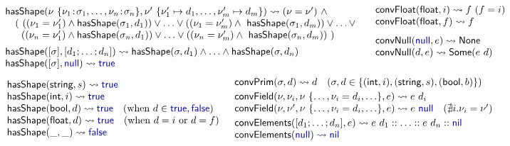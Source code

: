 \documentclass[pldi-cameraready]{sigplanconf-pldi16}
\newcommand{\kvd}[1]{\textnormal{\textcolor{kvdclr}{\sffamily #1}}}
\newcommand{\ident}[1]{\textnormal{\sffamily #1}}
\newcommand{\reduce}{\rightsquigarrow}
\begin{document}
\begin{figure}
\vspace{0.5em}
\noindent
\begin{equation*}
\begin{array}{l}
\ident{hasShape}(\nu~ \{ \nu_1 \!:\! \sigma_1, \ldots, \nu_n \!:\! \sigma_n \}, \nu'~\{ \nu'_1\mapsto d_1, \ldots, \nu'_m\mapsto d_m \}) \reduce (\nu = \nu') ~\wedge \\
  \quad (~ ((\nu_1 = \nu'_1) \wedge \ident{hasShape}(\sigma_1, d_1)) \vee\ldots\vee ((\nu_1 = \nu'_m) \wedge \ident{hasShape}(\sigma_1, d_m)) \vee \ldots \vee\\
  \quad ~\; ((\nu_n = \nu'_1) \wedge \ident{hasShape}(\sigma_n, d_1)) \vee\ldots\vee ((\nu_n = \nu'_m) \wedge \ident{hasShape}(\sigma_n, d_m))~)
\\[0.5em]
\ident{hasShape}([\sigma], [d_1; \ldots; d_n]) \reduce \ident{hasShape}(\sigma, d_1)\wedge\ldots\wedge\ident{hasShape}(\sigma, d_n) \\
\ident{hasShape}([\sigma], \kvd{null}) \reduce \kvd{true}
\end{array}
\quad
\begin{array}{l}
\\[-2.5em]
\ident{convFloat}(\ident{float}, i) \reduce f~(f=i) \\
\ident{convFloat}(\ident{float}, f) \reduce f \\[0.75em]
\ident{convNull}(\kvd{null}, e) \reduce \ident{None} \\
\ident{convNull}(d, e) \reduce \ident{Some}(e~d)
\end{array}
\end{equation*}
%
\vspace{-0.75em}
%
\begin{equation*}
\hspace{-1.1em}
\begin{array}{l}
\ident{hasShape}(\ident{string}, s) \reduce \kvd{true} \\
\ident{hasShape}(\ident{int}, i) \reduce \kvd{true}\\
\ident{hasShape}(\ident{bool}, d) \reduce \kvd{true} \quad(\textnormal{when}~d\in{\kvd{true},\kvd{false}} )\\
\ident{hasShape}(\ident{float}, d) \reduce \kvd{true} \quad(\textnormal{when}~d=i ~\textnormal{or}~ d=f) \\
\ident{hasShape}(\_, \_) \reduce \kvd{false} \\
\end{array}
\;\;
\begin{array}{l}
\ident{convPrim}(\sigma, d) \reduce d\quad(\sigma,d\in\{ (\ident{int},i),(\ident{string},s),(\ident{bool}, b) \})
\\[0.25em]
\ident{convField}(\nu,\nu_i, \nu~\{\ldots, \nu_i=d_i, \ldots\}, e) \reduce e~d_i\\
\ident{convField}(\nu,\nu', \nu~\{\ldots, \nu_i=d_i, \ldots\}, e) \reduce e~\kvd{null}\quad(\nexists i.\nu_i=\nu' )
\\[0.25em]
\ident{convElements}([d_1; \ldots; d_n], e) \reduce e~d_1 :: \ldots :: e~d_n :: \kvd{nil}  \\
\ident{convElements}(\kvd{null}) \reduce \kvd{nil}
\end{array}
\end{equation*}


\end{figure}
\end{document}
